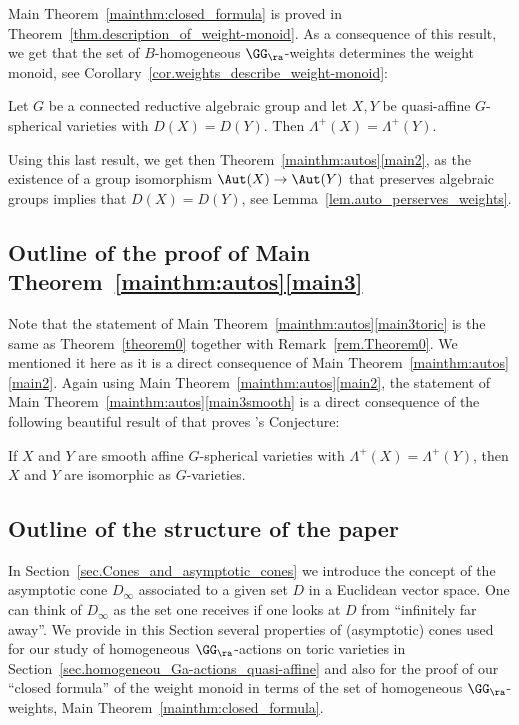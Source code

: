 Main Theorem~\ref{mainthm:closed_formula} is proved in Theorem~\ref{thm.description_of_weight-monoid}.
As a consequence of this result, we get that the set of $B$-homogeneous $\GG_\ra$-weights
determines the weight monoid, see Corollary~\ref{cor.weights_describe_weight-monoid}:

\begin{maintheorem}
\label{main_weight_monoid}
Let $G$ be a connected reductive algebraic group and let
$X, Y$ be quasi-affine $G$-spherical varieties with $D(X) = D(Y)$. Then $\Lambda^+(X) = \Lambda^+(Y)$.
\end{maintheorem}

Using this last result, we get then Theorem~\ref{mainthm:autos}\eqref{main2},
as the existence of a group isomorphism $\Aut(X) \to \Aut(Y)$ that preserves algebraic groups
implies that $D(X) = D(Y)$, see Lemma~\ref{lem.auto_perserves_weights}.

\subsection*{Outline of the proof of Main Theorem~\ref{mainthm:autos}\eqref{main3}}
Note that the statement of Main Theorem~\ref{mainthm:autos}\eqref{main3toric} is
the same as Theorem~\ref{theorem0}
together with Remark~\ref{rem.Theorem0}. We mentioned it here as it is a
direct consequence of Main Theorem~\ref{mainthm:autos}\eqref{main2}.
Again using Main Theorem~\ref{mainthm:autos}\eqref{main2},
the statement of Main Theorem~\ref{mainthm:autos}\eqref{main3smooth} is a direct
consequence of the following beautiful result of 
that proves 's Conjecture:

\begin{introtheorem}
\label{thm.losev}
If $X$ and $Y$ are smooth affine $G$-spherical varieties with $\Lambda^+(X) = \Lambda^+(Y)$,
then $X$ and $Y$ are isomorphic as $G$-varieties.
\end{introtheorem}

\subsection*{Outline of the structure of the paper }
In Section~\ref{sec.Cones_and_asymptotic_cones} we introduce the concept of the
asymptotic cone $D_{\infty}$ associated to a given set $D$ in a Euclidean vector space.
One can think of $D_{\infty}$ as the set one receives if one looks at $D$ from
``infinitely far away''. We provide in this Section several properties of (asymptotic) cones used
for our study of homogeneous $\GG_\ra$-actions on toric varieties in Section~\ref{sec.homogeneou_Ga-actions_quasi-affine} and also for the proof of
our ``closed formula'' of the weight monoid in terms of the set of homogeneous $\GG_\ra$-weights,
\ie Main Theorem~\ref{mainthm:closed_formula}.


